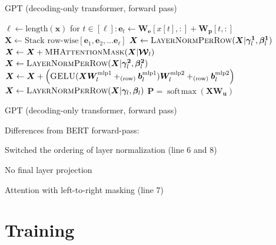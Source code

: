 \documentclass[12pt,aspectratio=169,handout]{beamer}
\DeclareMathOperator*{\softmax}{soft\!\max}
\begin{document}
\begin{frame}{GPT (decoding-only transformer, forward pass)}
	
\vspace{-2em}
\begin{minipage}[t][10cm][t]{15cm}
\begin{algorithmic}[1]
\State $\ell \gets \text{length}(\bm{x})$
\State for $t \in [\ell]: \bm{e}_t \gets \bm{W_e}[x[t],:] + \bm{W_p}[t,:]$
\State $\bm{X} \gets \text{Stack row-wise}[\bm{e}_1, \bm{e}_2, \ldots \bm{e}_{\ell}]$
\State $\bm{X} \gets \textsc{LayerNormPerRow}(\bm{X} | \bm{\gamma^1}_l, \bm{\beta^1}_l)$
\State $\bm{X} \gets \bm{X} + \textsc{MHAttentionMask}(\bm{X} | \bm{\mathcal{W}}_l)$
\State $\bm{X} \gets \textsc{LayerNormPerRow}(\bm{X} | \bm{\gamma^2}_l, \bm{\beta^2}_l)$
\State $\bm{X} \gets \bm{X} + \left(
\textsc{GELU}(\bm{X} \bm{W}^\text{mlp1}_l +_{\text{(row)}} \bm{b}^\text{mlp1}_l )
\bm{W}^{\text{mlp2}}_l +_{\text{(row)}} \bm{b}^{\text{mlp2}}_l \right)$
\EndFor
\State $\bm{X} \gets \textsc{LayerNormPerRow}(\bm{X} | \bm{\gamma}_l, \bm{\beta}_l)$
\State \Return $\bm{P} = \softmax(\bm{X} \bm{W_u}) $
\EndFunction
\end{algorithmic}

\end{minipage}
\end{frame}


\begin{frame}{GPT (decoding-only transformer, forward pass)}

Differences from BERT forward-pass:

Switched the ordering of layer normalization (line 6 and 8)

No final layer projection

Attention with left-to-right masking (line 7)

\end{frame}





\section{Training}
\end{document}
